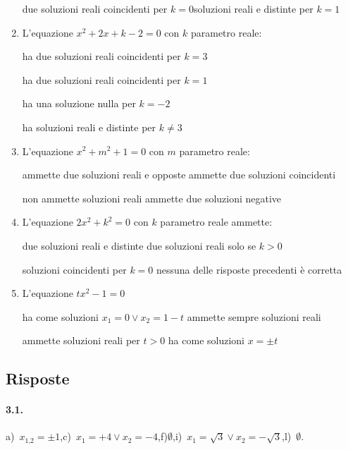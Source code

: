 \begin{esercizio}[\Ast]
\begin{enumerate}
\boxC\; due soluzioni reali coincidenti per $ k=0 $\quad\boxD\;soluzioni reali e distinte per $ k=1 $

	\item L'equazione $x^{2} + 2x + k-2 = 0$ con $ k $ parametro reale:

\boxA\quad ha due soluzioni reali coincidenti per $ k=3 $

\boxB\quad ha due soluzioni reali coincidenti per $ k=1 $

\boxC\quad ha una soluzione nulla per $k =-2$

\boxD\quad ha soluzioni reali e distinte per $k \neq 3$

	\item L'equazione $x^{2} + m^{2} + 1 = 0$ con $m$ parametro reale:

\boxA\; ammette due soluzioni reali e opposte\quad\boxB\; ammette due soluzioni coincidenti

\boxC\; non ammette soluzioni reali\quad\boxD\; ammette due soluzioni negative

	\item L'equazione $2x^{2} + k^{2} = 0$ con $k$ parametro reale ammette:

\boxA\; due soluzioni reali e distinte\quad\boxB\; due soluzioni reali solo se $k>0$

\boxC\; soluzioni coincidenti per $k = 0$\quad\boxD\; nessuna delle risposte precedenti è corretta

	\item L'equazione $tx^{2}-1 = 0$

\boxA\; ha come soluzioni $x_{1} = 0 \vee x_{2} = 1-t$\quad\boxB\; ammette sempre soluzioni reali

\boxC\; ammette soluzioni reali per $t > 0$\quad\boxD\; ha come soluzioni $x = \pm t$

\end{enumerate}
\end{esercizio}

\subsection{Risposte}
\paragraph{3.1.} a)~$x_{1\text{,}2} = \pm 1$,\quad  c)~$x_{1}=+4 \vee x_{2}=-4$,\quad f)$\emptyset$,\quad i)~$x_{1} = \sqrt{3} \vee x _{2} = - \sqrt{3}$,\quad l)~$\emptyset$.

